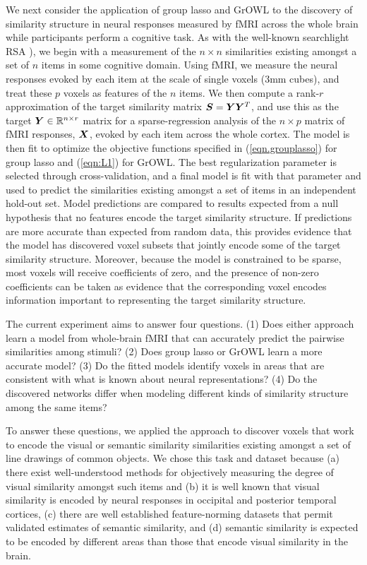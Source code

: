 We next consider the application of group lasso and GrOWL to the discovery of similarity
structure in neural responses measured by fMRI across the whole brain while participants
perform a cognitive task. As with the well-known searchlight RSA \citep{RSA,similarity}), we begin with a measurement of the $n \times n $ similarities existing
amongst a set of $n$ items in some cognitive domain. Using fMRI, we measure the neural
responses evoked by each item at the scale of single voxels (3mm cubes), and treat these
$p$ voxels as features of the $n$ items. We then compute a rank-$r$ approximation of the
target similarity matrix $\boldsymbol{S} = \boldsymbol{Y} \boldsymbol{Y}^T$, and use this as the target $\boldsymbol{Y} \in {\mathbb R}^{n
  \times r} $ matrix for a sparse-regression analysis of the $n \times p$ matrix of fMRI
responses, $\boldsymbol{X}$, evoked by each item across the whole cortex. The model is then fit to
optimize the objective functions specified in (\ref{eqn.grouplasso}) for group lasso and
(\ref{eqn:L1}) for GrOWL. The best regularization parameter is selected through
cross-validation, and a final model is fit with that parameter and used to predict the
similarities existing amongst a set of items in an independent hold-out set. Model
predictions are compared to results expected from a null hypothesis that no features
encode the target similarity structure. If predictions are more accurate than expected
from random data, this provides evidence that the model has discovered voxel subsets that
jointly encode some of the target similarity structure. Moreover, because the model is
constrained to be sparse, most voxels will receive coefficients of zero, and the presence
of non-zero coefficients can be taken as evidence that the corresponding voxel encodes
information important to representing the target similarity structure.

The current experiment aims to answer four questions. (1) Does either approach learn a
model from whole-brain fMRI that can accurately predict the pairwise similarities among
stimuli? (2) Does group lasso or GrOWL learn a more accurate model? (3) Do the fitted
models identify voxels in areas that are consistent with what is known about neural
representations? (4) Do the discovered networks differ when modeling different kinds of
similarity structure among the same items?

To answer these questions, we applied the approach to discover voxels that work to encode
the visual or semantic similarity similarities existing amongst a set of line drawings of
common objects. We chose this task and dataset because (a) there exist well-understood
methods for objectively measuring the degree of visual similarity amongst such items
\citep{antani02} and (b) it is well known that visual similarity is encoded by neural
responses in occipital and posterior temporal cortices, (c) there are well established
feature-norming datasets that permit validated estimates of semantic similarity, and (d)
semantic similarity is expected to be encoded by different areas than those that encode visual similarity in the brain.

